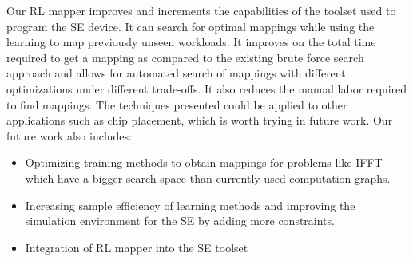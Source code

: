 Our RL mapper improves and increments the capabilities of the toolset used to program the SE device. 
It can search for optimal mappings while using the learning to map previously unseen workloads. 
It improves on the total time required to get a mapping as compared to the existing brute force search approach and allows for automated search of mappings with different optimizations under different trade-offs. 
It also reduces the manual labor required to find mappings. 
The techniques presented could be applied to other applications such as chip placement, which is worth trying in future work. 
Our future work also includes: 
\begin{itemize}
\item Optimizing training methods to obtain mappings for problems like IFFT which have a bigger search space than currently used computation graphs. 
\item Increasing sample efficiency of learning methods and improving the simulation environment for the SE by adding more constraints. 
\item Integration of RL mapper into the SE toolset 
\end{itemize}